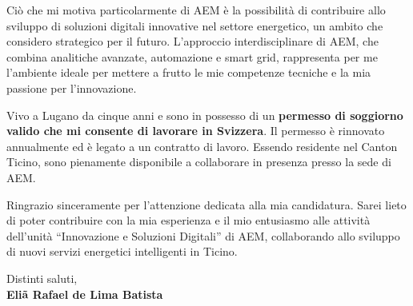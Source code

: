 \documentclass[11pt]{article}
\begin{document}
Ciò che mi motiva particolarmente di AEM è la possibilità di contribuire allo sviluppo di soluzioni digitali innovative nel settore energetico, un ambito che considero strategico per il futuro. L’approccio interdisciplinare di AEM, che combina analitiche avanzate, automazione e smart grid, rappresenta per me l’ambiente ideale per mettere a frutto le mie competenze tecniche e la mia passione per l’innovazione.

Vivo a Lugano da cinque anni e sono in possesso di un \textbf{permesso di soggiorno valido che mi consente di lavorare in Svizzera}. Il permesso è rinnovato annualmente ed è legato a un contratto di lavoro. Essendo residente nel Canton Ticino, sono pienamente disponibile a collaborare in presenza presso la sede di AEM.


Ringrazio sinceramente per l’attenzione dedicata alla mia candidatura. Sarei lieto di poter contribuire con la mia esperienza e il mio entusiasmo alle attività dell’unità “Innovazione e Soluzioni Digitali” di AEM, collaborando allo sviluppo di nuovi servizi energetici intelligenti in Ticino.

\vspace{1em}

Distinti saluti, \\
\textbf{Eliã Rafael de Lima Batista}
\end{document}
